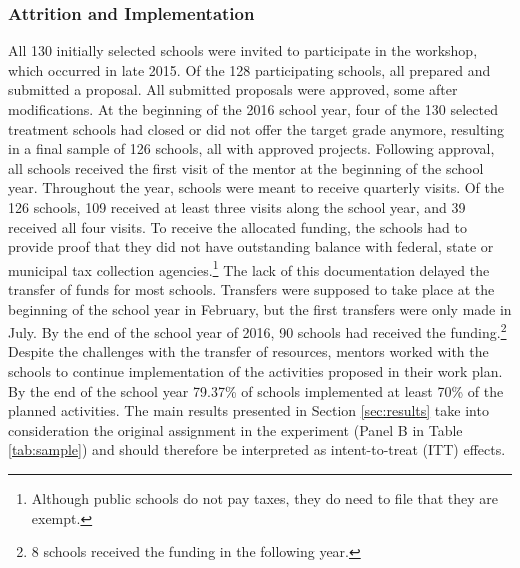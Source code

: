 \documentclass[11pt,a4paper]{article}
\begin{document}
\subsubsection*{Attrition and Implementation}
All 130 initially selected schools were invited to participate in the workshop, which occurred in late 2015. Of the 128 participating schools, all prepared and submitted a proposal. All submitted proposals were approved, some after modifications. At the beginning of the 2016 school year, four of the 130 selected treatment schools had closed or did not offer the target grade anymore, resulting in a final sample of 126 schools, all with approved projects.  Following approval, all schools received the first visit of the mentor at the beginning of the school year. Throughout the year, schools were meant to receive quarterly visits. Of the 126 schools, 109 received at least three visits along the school year, and 39 received all four visits. To receive the allocated funding, the schools had to provide proof that they did not have outstanding balance with federal, state or municipal tax collection agencies.\footnote{Although public schools do not pay taxes, they do need to file that they are exempt.} The lack of this documentation delayed the transfer of funds for most schools. Transfers were supposed to take place at the beginning of the school year in February, but the first transfers were only made in July. By the end of the school year of 2016, 90 schools had received the funding.\footnote{8 schools received the funding in the following year.} Despite the challenges with the transfer of resources, mentors worked with the schools to continue implementation of the activities proposed in their work plan. By the end of the school year 79.37\% of schools implemented at least 70\% of the planned activities. The main results presented in Section \ref{sec:results} take into consideration the original assignment in the experiment (Panel B in Table \ref{tab:sample}) and should therefore be interpreted as intent-to-treat (ITT) effects.
\end{document}
